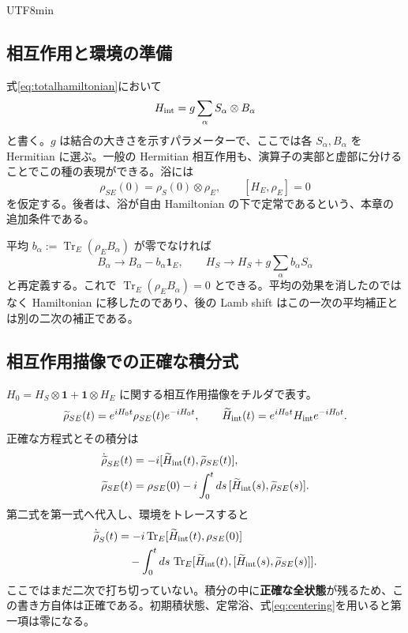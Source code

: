 \documentclass[11pt,a4paper]{article}
\numberwithin{equation}{section}
\newcommand{\Tr}{\operatorname{Tr}}
\newcommand{\I}{\mathbf{1}}
\begin{document}
\begin{CJK*}{UTF8}{min}
\subsection{相互作用と環境の準備}
式\eqref{eq:totalhamiltonian}において
\begin{equation}
H_{\rm int}=g\sum_\alpha S_\alpha\otimes B_\alpha
\label{eq:interaction}
\end{equation}
と書く。$g$ は結合の大きさを示すパラメーターで、ここでは各 $S_\alpha,B_\alpha$ を Hermitian に選ぶ。一般の Hermitian 相互作用も、演算子の実部と虚部に分けることでこの種の表現ができる。浴には
\begin{equation}
\rho_{SE}(0)=\rho_S(0)\otimes\rho_E,
\qquad[H_E,\rho_E]=0
\label{eq:microinitial}
\end{equation}
を仮定する。後者は、浴が自由 Hamiltonian の下で定常であるという、本章の追加条件である。

平均 $b_\alpha:=\Tr_E(\rho_EB_\alpha)$ が零でなければ
\begin{equation}
B_\alpha\longrightarrow B_\alpha-b_\alpha\I_E,
\qquad H_S\longrightarrow H_S+g\sum_\alpha b_\alpha S_\alpha
\label{eq:centering}
\end{equation}
と再定義する。これで $\Tr_E(\rho_E B_\alpha)=0$ とできる。平均の効果を消したのではなく Hamiltonian に移したのであり、後の Lamb shift はこの一次の平均補正とは別の二次の補正である。

\subsection{相互作用描像での正確な積分式}
$H_0=H_S\otimes\I+\I\otimes H_E$ に関する相互作用描像をチルダで表す。
\begin{equation}
\widetilde\rho_{SE}(t)=e^{iH_0t}\rho_{SE}(t)e^{-iH_0t},
\qquad \widetilde H_{\rm int}(t)=e^{iH_0t}H_{\rm int}e^{-iH_0t}.
\end{equation}
正確な方程式とその積分は
\begin{align}
\dot{\widetilde\rho}_{SE}(t)
&=-i[\widetilde H_{\rm int}(t),\widetilde\rho_{SE}(t)],\\
\widetilde\rho_{SE}(t)
&=\rho_{SE}(0)-i\int_0^t ds\,
[\widetilde H_{\rm int}(s),\widetilde\rho_{SE}(s)].
\end{align}
第二式を第一式へ代入し、環境をトレースすると
\begin{align}
\dot{\widetilde\rho}_S(t)
&=-i\Tr_E[\widetilde H_{\rm int}(t),\rho_{SE}(0)]\nonumber\\
&\quad-\int_0^t ds\,\Tr_E
[\widetilde H_{\rm int}(t),
[\widetilde H_{\rm int}(s),\widetilde\rho_{SE}(s)]].
\label{eq:exact-integral}
\end{align}
ここではまだ二次で打ち切っていない。積分の中に\textbf{正確な全状態}が残るため、この書き方自体は正確である。初期積状態、定常浴、式\eqref{eq:centering}を用いると第一項は零になる。


\end{CJK*}
\end{document}

